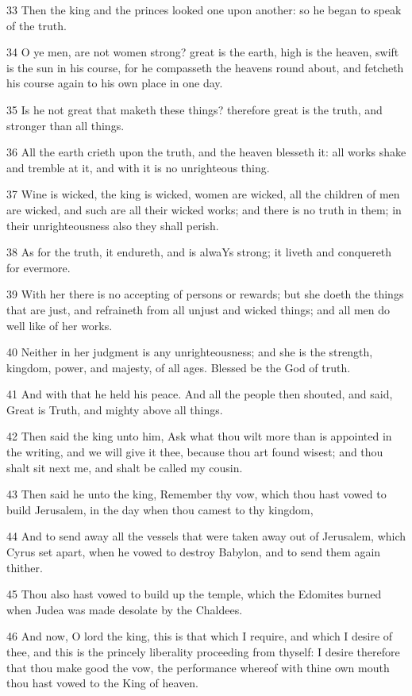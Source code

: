\par 33 Then the king and the princes looked one upon another: so he began to speak of the truth.
\par 34 O ye men, are not women strong? great is the earth, high is the heaven, swift is the sun in his course, for he compasseth the heavens round about, and fetcheth his course again to his own place in one day.
\par 35 Is he not great that maketh these things? therefore great is the truth, and stronger than all things.
\par 36 All the earth crieth upon the truth, and the heaven blesseth it: all works shake and tremble at it, and with it is no unrighteous thing.
\par 37 Wine is wicked, the king is wicked, women are wicked, all the children of men are wicked, and such are all their wicked works; and there is no truth in them; in their unrighteousness also they shall perish.
\par 38 As for the truth, it endureth, and is alwaYs strong; it liveth and conquereth for evermore.
\par 39 With her there is no accepting of persons or rewards; but she doeth the things that are just, and refraineth from all unjust and wicked things; and all men do well like of her works.
\par 40 Neither in her judgment is any unrighteousness; and she is the strength, kingdom, power, and majesty, of all ages. Blessed be the God of truth.
\par 41 And with that he held his peace. And all the people then shouted, and said, Great is Truth, and mighty above all things.
\par 42 Then said the king unto him, Ask what thou wilt more than is appointed in the writing, and we will give it thee, because thou art found wisest; and thou shalt sit next me, and shalt be called my cousin.
\par 43 Then said he unto the king, Remember thy vow, which thou hast vowed to build Jerusalem, in the day when thou camest to thy kingdom,
\par 44 And to send away all the vessels that were taken away out of Jerusalem, which Cyrus set apart, when he vowed to destroy Babylon, and to send them again thither.
\par 45 Thou also hast vowed to build up the temple, which the Edomites burned when Judea was made desolate by the Chaldees.
\par 46 And now, O lord the king, this is that which I require, and which I desire of thee, and this is the princely liberality proceeding from thyself: I desire therefore that thou make good the vow, the performance whereof with thine own mouth thou hast vowed to the King of heaven.
